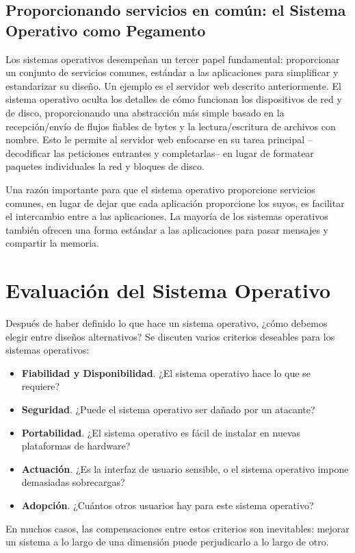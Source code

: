 \documentclass[10pt]{book}
\begin{document}
\subsection{Proporcionando servicios en común: el Sistema Operativo como Pegamento}
Los sistemas operativos desempeñan un tercer papel fundamental: proporcionar un conjunto de servicios comunes, estándar a las aplicaciones para simplificar y estandarizar su diseño. Un ejemplo es el servidor web descrito anteriormente. El sistema operativo oculta los detalles de cómo funcionan los dispositivos de red y de disco, proporcionando una abstracción más simple basado en la recepción/envío de flujos fiables de bytes y la lectura/escritura de archivos con nombre. Esto le permite al servidor web enfocarse en su tarea principal --decodificar las peticiones entrantes y completarlas-- en lugar de formatear paquetes individuales la red y bloques de disco.

Una razón importante para que el sistema operativo proporcione servicios comunes, en lugar de dejar que cada aplicación proporcione los suyos, es facilitar el intercambio entre a las aplicaciones. La mayoría de los sistemas operativos también ofrecen una forma estándar a las aplicaciones para pasar mensajes y compartir la memoria.


\section{Evaluación del Sistema Operativo}
Después de haber definido lo que hace un sistema operativo, ¿cómo debemos elegir entre diseños alternativos? Se discuten varios criterios deseables para los sistemas operativos:
\begin{itemize}
\item \textbf{Fiabilidad y Disponibilidad}. ¿El sistema operativo hace lo que se requiere?
\item \textbf{Seguridad}. ¿Puede el sistema operativo ser dañado por un atacante?
\item \textbf{Portabilidad}. ¿El sistema operativo es fácil de instalar en nuevas plataformas de hardware?
\item \textbf{Actuación}. ¿Es la interfaz de usuario sensible, o el sistema operativo impone demasiadas sobrecargas?
\item \textbf{Adopción}. ¿Cuántos otros usuarios hay para este sistema operativo?
\end{itemize}

En muchos casos, las compensaciones entre estos criterios son inevitables: mejorar un sistema a lo largo de una dimensión puede perjudicarlo a lo largo de otro.
\end{document}
